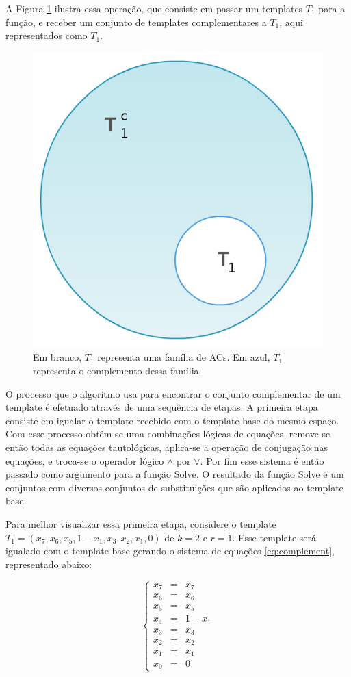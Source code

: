 \documentclass[12pt,a4paper]{article}
\begin{document}
	A Figura \ref{fig:complement} ilustra essa operação, que consiste em passar um templates $T_1$ para a função, e receber um conjunto de templates complementares a $T_1$, aqui representados como $\bar{T_1}$.

	\begin{figure}[h!]
	  \centering
	  \includegraphics[width=.3\textwidth]{fig_complement}
	  \caption{Em branco, $T_1$ representa uma família de ACs. Em azul, $\bar{T_1}$ representa o complemento dessa família.}
	  \label{fig:complement}
	\end{figure}

	O processo que o algoritmo usa para encontrar o conjunto complementar de um template é efetuado através de uma sequência de etapas. A primeira etapa consiste em igualar o template recebido com o template base do mesmo espaço. Com esse processo obtêm-se uma combinações lógicas de equações, remove-se então todas as equações tautológicas, aplica-se a operação de conjugação nas equações, e troca-se o operador lógico $\wedge$ por $\vee$. Por fim esse sistema é então passado como argumento para a função Solve. O resultado da função Solve é um conjuntos com diversos conjuntos de substituições que são aplicados ao template base.

	Para melhor visualizar essa primeira etapa, considere o template $T_1 = (x_7, x_6, x_5, 1 - x_1, x_3, x_2, x_1, 0)$ de $k=2$ e $r=1$. Esse template será igualado com o template base gerando o sistema de equações \ref{eq:complement}, representado abaixo:
	
	\begin{equation}
	\left\{\begin{matrix}
	x_7 & = & x_7	\\ 
	x_6 & = & x_6	\\ 
	x_5 & = & x_5	\\ 
	x_4 & = & 1 - x_1 \\ 
	x_3 & = & x_3	\\ 
	x_2 & = & x_2	\\ 
	x_1 & = & x_1	\\ 
	x_0 & = & 0
	\end{matrix}\right.
	\label{eq:complement}
	\end{equation}
\end{document}
